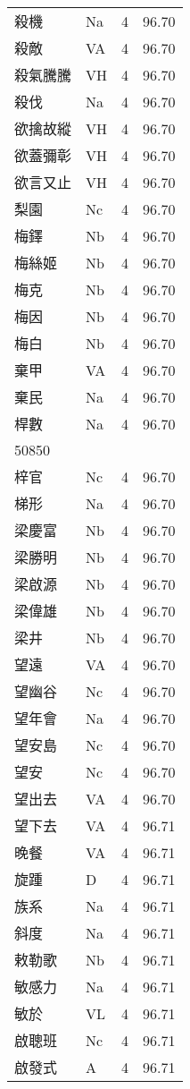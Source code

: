 \documentclass[twocolumn]{book}
\begin{document}
\begin{supertabular}{llrr}
殺機 & Na & 4 &  96.70\\
殺敵 & VA & 4 &  96.70\\
殺氣騰騰 & VH & 4 &  96.70\\
殺伐 & Na & 4 &  96.70\\
欲擒故縱 & VH & 4 &  96.70\\
欲蓋彌彰 & VH & 4 &  96.70\\
欲言又止 & VH & 4 &  96.70\\
梨園 & Nc & 4 &  96.70\\
梅鐸 & Nb & 4 &  96.70\\
梅絲姬 & Nb & 4 &  96.70\\
梅克 & Nb & 4 &  96.70\\
梅因 & Nb & 4 &  96.70\\
梅白 & Nb & 4 &  96.70\\
棄甲 & VA & 4 &  96.70\\
棄民 & Na & 4 &  96.70\\
桿數 & Na & 4 &  96.70\\
50850\\
梓官 & Nc & 4 &  96.70\\
梯形 & Na & 4 &  96.70\\
梁慶富 & Nb & 4 &  96.70\\
梁勝明 & Nb & 4 &  96.70\\
梁啟源 & Nb & 4 &  96.70\\
梁偉雄 & Nb & 4 &  96.70\\
梁井 & Nb & 4 &  96.70\\
望遠 & VA & 4 &  96.70\\
望幽谷 & Nc & 4 &  96.70\\
望年會 & Na & 4 &  96.70\\
望安島 & Nc & 4 &  96.70\\
望安 & Nc & 4 &  96.70\\
望出去 & VA & 4 &  96.70\\
望下去 & VA & 4 &  96.71\\
晚餐 & VA & 4 &  96.71\\
旋踵 & D & 4 &  96.71\\
族系 & Na & 4 &  96.71\\
斜度 & Na & 4 &  96.71\\
敕勒歌 & Nb & 4 &  96.71\\
敏感力 & Na & 4 &  96.71\\
敏於 & VL & 4 &  96.71\\
啟聰班 & Nc & 4 &  96.71\\
啟發式 & A & 4 &  96.71\\

\end{supertabular}
\end{document}
